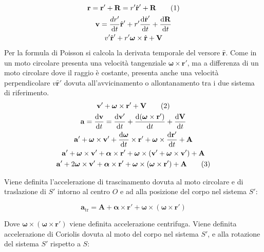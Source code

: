 \documentclass{article}
\newcommand{\vect}[1]{\boldsymbol{\mathbf{#1}}}
\newcommand{\df}{\mathrm{d}}
\numberwithin{equation}{subsection}
\begin{document}
\begin{gather*}
    \vect{r}=\vect{r}'+\vect{R}=r'\hat{\vect{r}}'+\vect{R}\tag{\stepcounter{equation}\theequation}\\
    \vect{v}=\displaystyle\frac{dr'}{\df t}\hat{\vect{r}}'+r'\frac{\df\hat{\vect{r}}'}{\df t}+\frac{\df\vect{R}}{\df t}\\
    v'\hat{\vect{r}}'+r'\vect{\omega}\times\hat{\vect{r}}+\vect{V}
\end{gather*}
Per la formula di Poisson si calcola la derivata temporale del versore $\hat{\vect{r}}$. 
Come in un moto circolare presenta una velocità tangenziale $\vect{\omega}\times\vect{r}'$, ma a differenza di un moto circolare dove il raggio è costante, presenta anche una 
velocità perpendicolare $v\hat{\vect{r}}'$ dovuta all'avvicinamento o allontanamento tra i due sistema di riferimento. 
\begin{gather*}
    \vect{v}'+\vect{\omega}\times\vect{r}'+\vect{V}\tag{\stepcounter{equation}\theequation}\\
    \vect{a}=\displaystyle\frac{\df\vect{v}}{\df t}=\frac{\df\vect{v}'}{\df t}+\frac{\df(\vect{\omega}\times\vect{r}')}{\df t}+\frac{\df\vect{V}}{\df t}\\
    \vect{a}'+\vect{\omega}\times\vect{v}'+\displaystyle\frac{\df\vect{\omega}}{\df t}\times\vect{r}'+\vect{\omega}\times\frac{\df\vect{r}'}{\df t}+\vect{A}\\
    \vect{a}'+\vect{\omega}\times\vect{v}'+\vect{\alpha}\times\vect{r}'+\vect{\omega}\times(\vect{v}'+\vect{\omega}\times\vect{v}')+\vect{A}\\
    \vect{a}'+2\vect{\omega}\times\vect{v}'+\vect{\alpha}\times\vect{r}'+\vect{\omega}\times(\vect{\omega}\times\vect{r}')+\vect{A}\tag{\stepcounter{equation}\theequation}
\end{gather*}

Viene definita l'accelerazione di trascinamento dovuta al moto 
circolare e di traslazione di $S'$ intorno al centro $O$ e ad alla posizione del corpo nel sistema $S'$: 

\begin{equation}
    \vect{a}_\mathrm{tr}=\vect{A}+\vect{\alpha}\times\vect{r}'+\vect{\omega}\times(\vect{\omega}\times\vect{r}')
\end{equation}

Dove $\vect{\omega}\times(\vect{\omega}\times\vect{r}')$ viene 
definita accelerazione centrifuga.
Viene definita accelerazione di Coriolis dovuta al moto del 
corpo nel sistema $S'$, e alla rotazione del sistema $S'$ rispetto a $S$:
\end{document}
